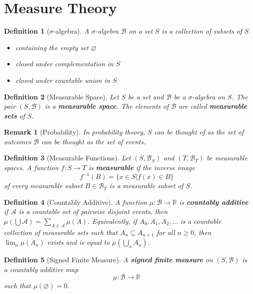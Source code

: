 \documentclass{article}
\newtheorem*{definition}{Definition}
\newtheorem*{remark}{Remark}
\begin{document}
\section{Measure Theory}
	\begin{definition}[$\sigma$-algebra]
		A $\sigma$-algebra $\mathcal{B}$ on a set $S$ is a collection of subsets of $S$
		\begin{itemize}
			\item containing the empty set $\varnothing$
			\item closed under complementation in $S$
			\item closed under countable union in $S$
		\end{itemize}
	\end{definition}
	
	\begin{definition}[Measurable Space]
		Let $S$ be a set and $\mathcal{B}$ be a $\sigma$-algebra on $S$.
		The pair $(S, \mathcal{B})$ is a {\bf measurable space}.
		The elements of $\mathcal{B}$ are called {\bf measurable sets} of $S$.
	\end{definition}
	
	\begin{remark}[Probability]
		In probability theory, 
		$S$ can be thought of as the set of {\it outcomes}
		$\mathcal{B}$ can be thought as the set of {\it events}. 
	\end{remark}

	\begin{definition}[Measurable Functions]
		Let $(S, \mathcal{B}_S)$ and $(T, \mathcal{B}_T)$ be measurable spaces.
		A function $f : S \to T$ is {\bf measurable} if the inverse image
		$$ f^{-1}(B) = \{ x \in S | f(x) \in B \} $$
		of every measurable subset $B \in \mathcal{B}_T$ is a measurable subset of $S$.
	\end{definition}

	\begin{definition}[Countably Additive]
		A function $\mu : \mathcal{B} \to \mathbb{R}$ is {\bf countably additive}
		if $\mathcal{A}$ is a countable set of pairwise disjoint events,
		then $\mu(\bigcup \mathcal{A}) = \sum_{A \in \mathcal{A}} \mu(A)$.
		Equivalently, if $A_0, A_1, A_2,\dots$ is a countable collection of measurable sets
		such that $A_n \subseteq A_{n+1}$ for all $n \geq 0$,
		then $\lim_n \mu(A_n)$ exists and is equal to $\mu(\bigcup_n A_n)$.
	\end{definition}

	\begin{definition}[Signed Finite Measure]
		A {\bf signed finite measure} on $(S, \mathcal{B})$ is a countably additive map
		$$ \mu : \mathcal{B} \to \mathbb{R} $$
		such that $\mu(\varnothing) = 0$.	
	\end{definition}
\end{document}

